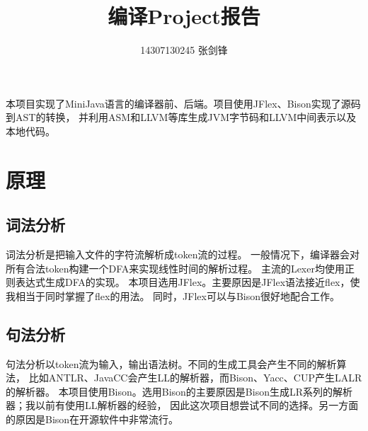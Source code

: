 \documentclass[a4paper]{article}
\title{编译Project报告}
\author{14307130245 张剑锋}
\begin{document}
\maketitle

本项目实现了MiniJava语言的编译器前、后端。项目使用JFlex、Bison实现了源码到AST的转换，
并利用ASM和LLVM等库生成JVM字节码和LLVM中间表示以及本地代码。

\section{原理}
\subsection{词法分析}
词法分析是把输入文件的字符流解析成token流的过程。
一般情况下，编译器会对所有合法token构建一个DFA来实现线性时间的解析过程。
主流的Lexer均使用正则表达式生成DFA的实现。
本项目选用JFlex。主要原因是JFlex语法接近flex，使我相当于同时掌握了flex的用法。
同时，JFlex可以与Bison很好地配合工作。

\subsection{句法分析}
句法分析以token流为输入，输出语法树。不同的生成工具会产生不同的解析算法，
比如ANTLR、JavaCC会产生LL的解析器，而Bison、Yacc、CUP产生LALR的解析器。
本项目使用Bison。选用Bison的主要原因是Bison生成LR系列的解析器；我以前有使用LL解析器的经验，
因此这次项目想尝试不同的选择。另一方面的原因是Bison在开源软件中非常流行。
\end{document}
